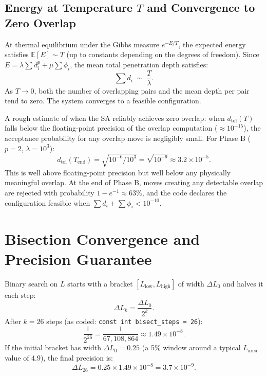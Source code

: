 \documentclass[11pt,oneside]{article}
\begin{document}
\subsection{Energy at Temperature $T$ and Convergence to Zero Overlap}

At thermal equilibrium under the Gibbs measure $e^{-E/T}$, the
expected energy satisfies $\mathbb{E}[E] \sim T$ (up to constants
depending on the degrees of freedom). Since $E = \lambda \sum d_i^p
+ \mu \sum \phi_i$, the mean total penetration depth satisfies:
\begin{equation}
  \sum d_i \;\sim\; \frac{T}{\lambda}.
  \label{eq:edepth}
\end{equation}
As $T \to 0$, both the number of overlapping pairs and the mean depth
per pair tend to zero. The system converges to a feasible configuration.

A rough estimate of when the SA reliably achieves zero overlap:
when $d_{\mathrm{tol}}(T)$ falls below the floating-point precision
of the overlap computation ($\approx 10^{-15}$), the acceptance
probability for any overlap move is negligibly small. For Phase B
($p=2$, $\lambda = 10^3$):
\[
  d_{\mathrm{tol}}(T_{\mathrm{end}}) = \sqrt{10^{-6}/10^3}
  = \sqrt{10^{-9}} \approx 3.2 \times 10^{-5}.
\]
This is well above floating-point precision but well below any
physically meaningful overlap. At the end of Phase B, moves creating
any detectable overlap are rejected with probability $1 - e^{-1}
\approx 63\%$, and the code declares the configuration feasible when
$\sum d_i + \sum \phi_i < 10^{-10}$.

\section{Bisection Convergence and Precision Guarantee}
\label{sec:bisect}

Binary search on $L$ starts with a bracket $[L_{\mathrm{low}},
L_{\mathrm{high}}]$ of width $\Delta L_0$ and halves it each step:
\begin{equation}
  \Delta L_k = \frac{\Delta L_0}{2^k}.
  \label{eq:bisect}
\end{equation}
After $k = 26$ steps (as coded: \texttt{const int bisect\_steps = 26}):
\[
  \frac{1}{2^{26}} = \frac{1}{67{,}108{,}864} \approx 1.49 \times 10^{-8}.
\]
If the initial bracket has width $\Delta L_0 = 0.25$ (a 5\% window
around a typical $L_{\mathrm{area}}$ value of 4.9), the final precision is:
\begin{equation}
  \Delta L_{26} = 0.25 \times 1.49 \times 10^{-8} = 3.7 \times 10^{-9}.
  \label{eq:precision}
\end{equation}
\end{document}
